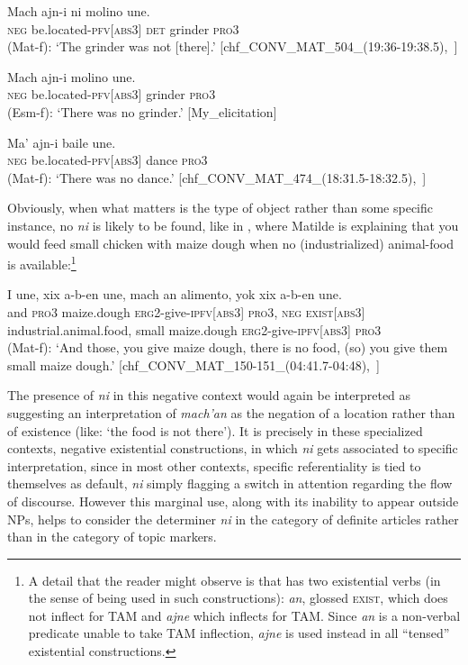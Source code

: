 \documentclass[output=paper
,modfonts
,nonflat]{langsci/langscibook}
\begin{document}
\ea \label{ex:pico:57}

\ea \label{ex:pico:57a}
\gll Mach ajn-i ni molino une. \\
\textsc{neg} be.located-{\textsc{pfv[abs3]}} \textsc{det} grinder {\textsc{pro3}}\\
\glt (Mat-f): `The grinder was not [there].' [chf\_CONV\_MAT\_504\_(19:36-19:38.5),~\citealt{Delgado-Galvan2018archive}]

\ex \label{ex:pico:57b}
\gll Mach ajn-i molino une.\\
\textsc{neg} be.located-{\textsc{pfv[abs3]}} grinder {\textsc{pro3}}\\
\glt (Esm-f): `There was no grinder.' [My\_elicitation]

\ex \label{ex:pico:57c}
\gll Ma' ajn-i baile une.
\\
\textsc{neg} be.located-{\textsc{pfv[abs3]}} dance {\textsc{pro3}}\\
\glt (Mat-f): `There was no dance.' [chf\_CONV\_MAT\_474\_(18:31.5-18:32.5),~\citealt{Delgado-Galvan2018archive}]
\z
\z

Obviously, when what matters is the type of object rather than some specific instance, no \textit{ni} is likely to be found, like in , where Matilde is explaining that you would feed small chicken with maize dough when no (industrialized) animal-food is available:\footnote{A detail that the reader might observe is that  has two existential verbs (in the sense of being used in such constructions): \textit{an}, glossed \textsc{exist}, which does not inflect for TAM and \textit{ajne} which inflects for TAM. Since \textit{an} is a non-verbal predicate unable to take TAM inflection, \textit{ajne} is used instead in all ``tensed'' existential constructions.}\newpage

\ea \label{ex:pico:58}

\gll I une, xix a-b-en une, mach an alimento, yok xix a-b-en une.\\
and \textsc{pro3} maize.dough  \textsc{erg2}-give-\textsc{ipfv[abs3]} \textsc{pro3}, \textsc{neg} \textsc{exist[abs3]} industrial.animal.food, small maize.dough \textsc{erg2}-give-\textsc{ipfv[abs3]} \textsc{pro3} \\
\glt (Mat-f): `And those, you give maize dough, there is no food, (so) you give them small maize dough.' [chf\_CONV\_MAT\_150-151\_(04:41.7-04:48),~\citealt{Delgado-Galvan2018archive}]
\z

The presence of \textit{ni} in this negative context would again be interpreted as suggesting an interpretation of \textit{mach'an} as the negation of a location rather than of existence (like: `the food is not there'). It is precisely in these specialized contexts, negative existential constructions, in which \textit{ni} gets associated to specific  interpretation, since in most other contexts, specific referentiality is tied to  themselves as default, \textit{ni} simply flagging a switch in attention regarding the flow of discourse. However this marginal use, along with its inability to appear outside NPs, helps to consider the determiner \textit{ni} in the category of definite articles rather than in the category of topic markers.
\end{document}
